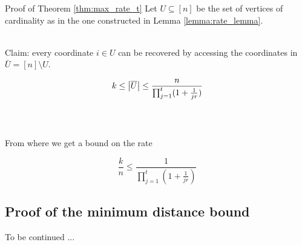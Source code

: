 \begin{frame}{Proof of Theorem \ref{thm:max_rate_t}}
    Let $U \subseteq [n]$ be the set of vertices of cardinality as in the one constructed in Lemma \ref{lemma:rate_lemma}. \\~\\ \pause
    
    Claim: every coordinate $i\in U$ can be recovered by accessing the coordinates in $\bar{U} = [n] \setminus U$. \pause
    
    $$ k \leq \left\vert {\overline{U}} \right\vert \leq \frac{n}{\prod_{j=1}^t (1 + \frac{1}{jr})}$$ \\~\\ \pause
    
    From where we get a bound on the rate
    
    $$\frac{k}{n} \leq \frac{1}{\prod_{j=1}^t (1 + \frac{1}{jr})}$$
\end{frame}

\subsection{Proof of the minimum distance bound}

\begin{frame}
\tableofcontents[ 
currentsubsection, 
hideothersubsections, 
sectionstyle=show/hide, 
subsectionstyle=show/shaded, 
] 
\end{frame}

\begin{frame}
    To be continued ...
\end{frame}